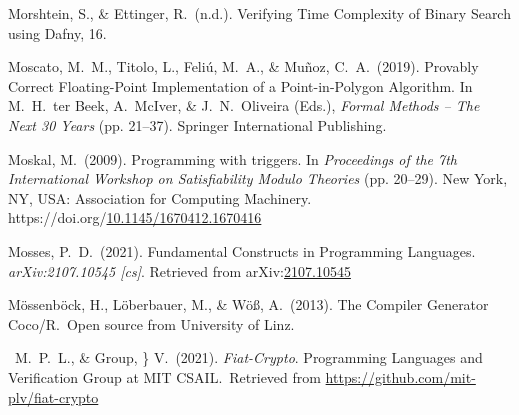 \documentclass[12pt,twoside]{article}
\begin{document}
{\begin{thebibliography}{1079}
\mdbibitemlabel{}Morshtein, S., \& Ettinger, R.~(n.d.). Verifying Time Complexity of Binary Search using Dafny, 16.%

\mdbibitemlabel{}Moscato, M.~M., Titolo, L., Feliú, M.~A., \& Muñoz, C.~A.~(2019). Provably Correct Floating-Point Implementation of a Point-in-Polygon Algorithm. In M.~H.~ter Beek, A.~McIver, \& J.~N.~Oliveira (Eds.), \emph{Formal Methods – The Next 30 Years} (pp. 21–37). Springer International Publishing.%

\mdbibitemlabel{}Moskal, M.~(2009). Programming with triggers. In \emph{Proceedings of the 7th International Workshop on Satisfiability Modulo Theories} (pp. 20–29). New York, NY, USA: Association for Computing Machinery. https://doi.org/\href{https://dx.doi.org/10.1145/1670412.1670416}{10.1145/1670412.1670416}%

\mdbibitemlabel{}Mosses, P.~D.~(2021). Fundamental Constructs in Programming Languages. \emph{arXiv:2107.10545 {}[cs]}. Retrieved from arXiv:\href{http://arxiv.org/abs/2107.10545}{2107.10545}%

\mdbibitemlabel{}M\"{o}ssenb\"{o}ck, H., L\"{o}berbauer, M., \& W\"{o}\ss{}, A.~(2013). The Compiler Generator Coco/R.~Open source from University of Linz.%

\mdbibitemlabel{}~M.~P.~L., \& Group,  \} V.~(2021). \emph{Fiat-Crypto}. Programming Languages and Verification Group at MIT CSAIL.~Retrieved from \href{https://github.com/mit-plv/fiat-crypto}{{\ttfamily https://\hspace{0pt}github.\hspace{0pt}com/\hspace{0pt}mit-\hspace{0pt}plv/\hspace{0pt}fiat-\hspace{0pt}crypto}}%


\end{thebibliography}}
\end{document}
